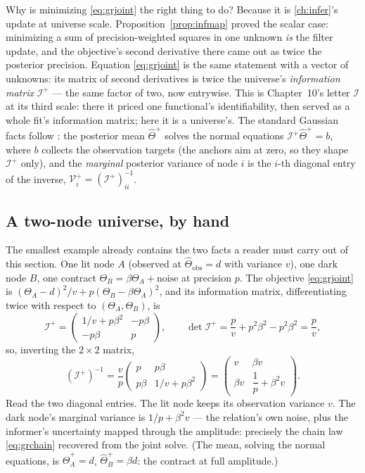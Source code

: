 Why is minimizing \cref{eq:grjoint} the right thing to do?  Because it
is \cref{ch:infer}'s update at universe scale.
Proposition~\ref{prop:infmap} proved the scalar case: minimizing a sum
of precision-weighted squares in one unknown \emph{is} the filter
update, and the objective's second derivative there came out as twice
the posterior precision.  Equation \cref{eq:grjoint} is the same
statement with a vector of unknowns: its matrix of second derivatives
is twice the universe's \emph{information matrix} $\mathcal{I}^{+}$
--- the same factor of two, now entrywise.  This is Chapter~10's
letter $\mathcal{I}$ at its third scale: there it priced one
functional's identifiability, then served as a whole fit's information
matrix; here it is a universe's.  The standard Gaussian facts
follow \citep{RasmussenWilliams2006,RueHeld2005}: the posterior mean
$\hat\Theta^{+}$ solves the normal equations
$\mathcal{I}^{+}\hat\Theta^{+}=b$, where $b$ collects the observation
targets (the anchors aim at zero, so they shape $\mathcal{I}^{+}$
only), and the \emph{marginal} posterior
variance of node $i$ is the $i$-th diagonal entry of the inverse,
$\mathcal{V}^{+}_i=(\mathcal{I}^{+})^{-1}_{ii}$.

\subsection{A two-node universe, by hand}

The smallest example already contains the two facts a reader must
carry out of this section.  One lit node $A$ (observed at
$\hat\Theta_{\mathrm{obs}}=d$ with variance $v$), one dark node $B$,
one contract $\Theta_B=\beta\Theta_A+\text{noise}$ at precision $p$.
The objective \cref{eq:grjoint} is
$(\Theta_A-d)^{2}/v+p(\Theta_B-\beta\Theta_A)^{2}$, and its
information matrix, differentiating twice with respect to
$(\Theta_A,\Theta_B)$, is
\[
\mathcal{I}^{+}
=\begin{pmatrix}1/v+p\beta^{2} & -p\beta\\[2pt] -p\beta & p\end{pmatrix},
\qquad
\det\mathcal{I}^{+}
=\frac{p}{v}+p^{2}\beta^{2}-p^{2}\beta^{2}
=\frac{p}{v},
\]
so, inverting the $2\times2$ matrix,
\[
(\mathcal{I}^{+})^{-1}
=\frac{v}{p}\begin{pmatrix}p & p\beta\\[2pt]
p\beta & 1/v+p\beta^{2}\end{pmatrix}
=\begin{pmatrix}v & \beta v\\[2pt]
\beta v & \dfrac{1}{p}+\beta^{2}v\end{pmatrix}.
\]
Read the two diagonal entries.  The lit node keeps its observation
variance $v$.  The dark node's marginal variance is
$1/p+\beta^{2}v$ --- the relation's own noise, plus the informer's
uncertainty mapped through the amplitude: precisely the chain law
\cref{eq:grchain} recovered from the joint solve.  (The mean,
solving the normal equations, is $\hat\Theta^{+}_A=d$,
$\hat\Theta^{+}_B=\beta d$: the contract at full amplitude.)

